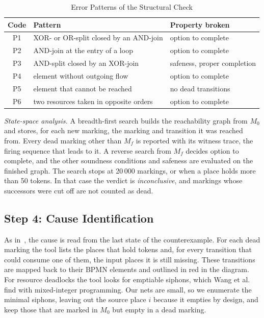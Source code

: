 \documentclass[conference]{IEEEtran}
\begin{document}
\begin{table}[htbp]
\caption{Error Patterns of the Structural Check}
\begin{center}
\begin{tabular}{|c|p{}|p{}|}
\hline
\textbf{Code} & \textbf{Pattern} & \textbf{Property broken} \\
\hline
P1 & XOR- or OR-split closed by an AND-join & option to complete \\
P2 & AND-join at the entry of a loop & option to complete \\
P3 & AND-split closed by an XOR-join & safeness, proper completion \\
P4 & element without outgoing flow & option to complete \\
P5 & element that cannot be reached & no dead transitions \\
P6 & two resources taken in opposite orders & option to complete \\
\hline
\end{tabular}
\label{tab:patterns}
\end{center}
\end{table}

\emph{State-space analysis.} A breadth-first search builds the reachability graph from $M_0$ and stores, for
each new marking, the marking and transition it was reached from. Every dead marking other than $M_f$ is
reported with its witness trace, the firing sequence that leads to it. A reverse search from $M_f$ decides
option to complete, and the other soundness conditions and safeness are evaluated on the finished graph. The
search stops at 20\,000 markings, or when a place holds more than 50 tokens. In that case the verdict is
\emph{inconclusive}, and markings whose successors were cut off are not counted as dead.

\subsection{Step 4: Cause Identification}
As in~\cite{kraeuter}, the cause is read from the last state of the counterexample. For each dead marking the
tool lists the places that hold tokens and, for every transition that could consume one of them, the input
places it is still missing. These transitions are mapped back to their BPMN elements and outlined in red in the
diagram. For resource deadlocks the tool looks for emptiable siphons, which Wang et al.~\cite{wang} find with
mixed-integer programming. Our nets are small, so we enumerate the minimal siphons, leaving out the source
place $i$ because it empties by design, and keep those that are marked in $M_0$ but empty in a dead marking.
\end{document}
